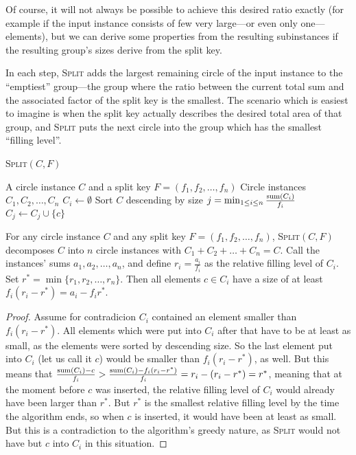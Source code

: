\documentclass[%
    a4paper,              %
    style=screen,          %
    bibliography=totoc,   %
    nexus,                %
    lnum,                 %
    extramargin,          %
]{tubsbook}
\begin{document}
Of course, it will not always be possible to achieve this desired ratio exactly (for example if the input instance consists of few very large---or even only one---elements), but we can derive some properties from the resulting subinstances if the resulting group's sizes derive from the split key.

In each step, \textsc{Split} adds the largest remaining circle of the input instance to the “emptiest” group---the group where the ratio between the current total sum and the associated factor of the split key is the smallest. The scenario which is easiest to imagine is when the split key actually describes the desired total area of that group, and \textsc{Split} puts the next circle into the group which has the smallest “filling level”.

\begin{algorithm}[htbp!]
    \caption{\textsc{Split}$(C,F)$}
    \begin{algorithmic}
        \Require A circle instance $C$ and a split key $F = (f_1, f_2, \dots, f_n)$
        \Ensure Circle instances $C_1, C_2, \dots, C_n$
            \State $C_i \gets \emptyset$
        \EndFor
        \State Sort $C$ descending by size
            \State $j = \min_{1 \le i \le n} \frac{\operatorname{sum}(C_i)}{f_i}$
            \State $C_j \gets C_j \cup \{c\}$
        \EndFor
    \end{algorithmic}
\end{algorithm}

\begin{theorem}\label{th:split-property}
    For any circle instance $C$ and any split key $F = (f_1, f_2, \dots, f_n)$, \textsc{Split}$(C,F)$ decomposes $C$ into $n$ circle instances with $C_1 + C_2 + \dots + C_n = C$. 
    Call the instances' sums $a_1, a_2, \dots, a_n$, and define $r_i = \frac{a_i}{f_i}$ as the relative filling level of $C_i$.
    Set $r^* = \min\{r_1,r_2,\dots,r_n\}$.
    Then all elements $c \in C_i$ have a size of at least $f_i(r_i-r^*) = a_i - f_i r^*$.
\end{theorem}

\begin{proof}
    Assume for contradicion $C_i$ contained an element smaller than $f_i(r_i-r^*)$. All elements which were put into $C_i$ after that have to be at least as small, as the elements were sorted by descending size. So the last element put into $C_i$ (let us call it $c$) would be smaller than $f_i(r_i-r^*)$, as well.
    But this means that $\frac{\operatorname{sum}(C_i) - c}{f_i} > \frac{\operatorname{sum}(C_i) - f_i(r_i-r^*)}{f_i} = r_i - (r_i-r^*) = r^*$, meaning that at the moment before $c$ was inserted, the relative filling level of $C_i$ would already have been larger than $r^*$. But $r^*$ is the smallest relative filling level by the time the algorithm ends, so when $c$ is inserted, it would have been at least as small. But this is a contradiction to the algorithm's greedy nature, as \textsc{Split} would not have but $c$ into $C_i$ in this situation.
\end{proof}
\end{document}
